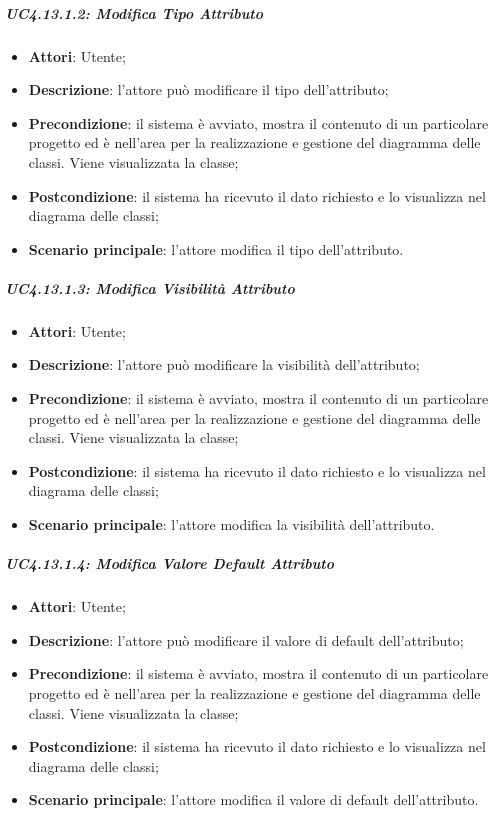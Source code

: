 \subparagraph{UC4.13.1.2: Modifica Tipo Attributo}
\label{UC4.13.1.2}
\begin{itemize}
	\item \textbf{Attori}: Utente;
	\item \textbf{Descrizione}: l'attore può modificare il tipo dell'attributo;
	\item \textbf{Precondizione}: il sistema è avviato, mostra il contenuto di un particolare progetto ed è nell'area per la realizzazione e gestione del diagramma delle classi. Viene visualizzata la classe;
	\item \textbf{Postcondizione}: il sistema ha ricevuto il dato richiesto e lo visualizza nel diagrama delle classi;
	\item \textbf{Scenario principale}: l'attore modifica il tipo dell'attributo.
\end{itemize}

\subparagraph{UC4.13.1.3: Modifica Visibilità Attributo}
\label{UC4.13.1.3}
\begin{itemize}
	\item \textbf{Attori}: Utente;
	\item \textbf{Descrizione}: l'attore può modificare la visibilità dell'attributo;
	\item \textbf{Precondizione}: il sistema è avviato, mostra il contenuto di un particolare progetto ed è nell'area per la realizzazione e gestione del diagramma delle classi. Viene visualizzata la classe;
	\item \textbf{Postcondizione}: il sistema ha ricevuto il dato richiesto e lo visualizza nel diagrama delle classi;
	\item \textbf{Scenario principale}: l'attore modifica la visibilità dell'attributo.
\end{itemize}

\subparagraph{UC4.13.1.4: Modifica Valore Default Attributo}
\label{UC4.13.1.4}
\begin{itemize}
	\item \textbf{Attori}: Utente;
	\item \textbf{Descrizione}: l'attore può modificare il valore di default dell'attributo;
	\item \textbf{Precondizione}: il sistema è avviato, mostra il contenuto di un particolare progetto ed è nell'area per la realizzazione e gestione del diagramma delle classi. Viene visualizzata la classe;
	\item \textbf{Postcondizione}: il sistema ha ricevuto il dato richiesto e lo visualizza nel diagrama delle classi;
	\item \textbf{Scenario principale}: l'attore modifica  il valore di default dell'attributo.
\end{itemize}

